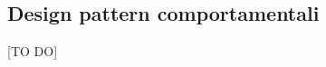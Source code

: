 %
%


\subsection{Design pattern comportamentali} %
\label{sub:design_pattern_comportamentali}
[TO DO]

